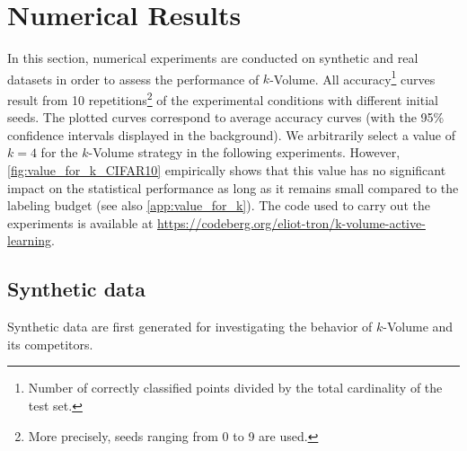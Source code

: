 \documentclass[twoside]{article}
\theoremstyle{definition}
\theoremstyle{remark}
\begin{document}
\section{Numerical Results}
\label{sec:num_results}
%
In this section, numerical experiments
are conducted on synthetic and real datasets in order to assess the performance of $k$-Volume.
%
%
All accuracy\footnote{Number of correctly classified points divided by the total cardinality of the test set.} curves result from 10 repetitions\footnote{More precisely, seeds ranging from 0 to 9 are used.} of the experimental conditions with different initial seeds.
%
The plotted curves correspond to average accuracy curves (with the 95\% confidence intervals displayed in the background).
We arbitrarily select a value of $k=4$ for the $k$-Volume strategy in the following experiments. However, \cref{fig:value_for_k_CIFAR10} empirically shows that this value has no significant impact on the statistical performance as long as it remains small compared to the labeling budget (see also \cref{app:value_for_k}). 
The code used to carry out the experiments is available 
at \url{https://codeberg.org/eliot-tron/k-volume-active-learning}.

\subsection{Synthetic data}
\label{sub:synth_data}

Synthetic data are first generated for investigating the behavior of $k$-Volume and its competitors.
\end{document}
